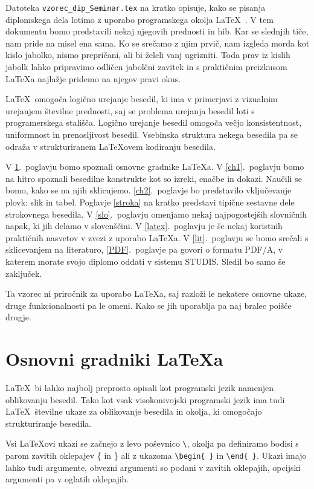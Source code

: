 \documentclass[a4paper, 12pt]{book}
\begin{document}
Datoteka {\tt vzorec\_dip\_Seminar.tex} na kratko opisuje, kako se pisanja diplomskega dela lotimo z uporabo programskega okolja \LaTeX~\cite{lamport,nenajkrajsi}. 
V tem dokumentu bomo predstavili nekaj njegovih prednosti in hib. 
Kar se slednjih tiče, nam pride na misel ena sama. 
Ko se srečamo z njim prvič, nam izgleda morda kot kislo jabolko, nismo prepričani, ali bi želeli vanj ugrizniti. 
Toda prav iz kislih jabolk lahko pripravimo odličen jabolčni zavitek in s praktičnim preizkusom \LaTeX a najlažje pridemo na njegov pravi okus.

\LaTeX\ omogoča logično urejanje besedil, ki ima v primerjavi z vizualnim urejanjem številne prednosti, saj se problema urejanja besedil loti s programerskega stališča.
Logično urejanje besedil omogoča večjo konsistentnost, uniformnost in  prenosljivost besedil. 
Vsebinska struktura nekega besedila pa se odraža v strukturiranem \LaTeX ovem kodiranju besedila.

V \ref{ch0}.~poglavju bomo spoznali osnovne gradnike \LaTeX{a}.
V \ref{ch1}.~poglavju bomo na hitro spoznali besedilne konstrukte kot so izreki, enačbe in dokazi. 
Naučili se bomo, kako se na njih sklicujemo. 
\ref{ch2}.~poglavje bo predstavilo vključevanje plovk: slik in tabel. 
Poglavje \ref{stroka} na kratko predstavi tipične sestavne dele strokovnega besedila.
V \ref{slo}.~poglavju omenjamo nekaj najpogostejših slovničnih napak, ki jih delamo v slovenščini.
V \ref{latex}.~poglavju je še nekaj koristnih praktičnih nasvetov v zvezi z uporabo \LaTeX{a}.
V \ref{lit}.~poglavju se bomo srečali s sklicevanjem na literaturo,
\ref{PDF}.~poglavje pa govori o formatu PDF/A, v katerem morate svojo diplomo oddati v sistemu STUDIS.
Sledil bo samo še zaključek.

Ta vzorec ni priročnik za uporabo \LaTeX{a}, saj razloži le nekatere osnovne ukaze, druge funkcionalnosti pa le omeni. Kako se jih uporablja
pa naj bralec poišče drugje.


\chapter{Osnovni gradniki \LaTeX{a}}
\label{ch0}

\LaTeX\ bi lahko najbolj preprosto opisali kot programski jezik namenjen oblikovanju besedil.
Tako kot vsak visokonivojski programski jezik ima tudi \LaTeX\  številne ukaze za oblikovanje  besedila in okolja, ki omogočajo strukturiranje besedila.

Vsi \LaTeX ovi ukazi se začnejo z levo poševnico  \verb=\=, okolja pa definiramo bodisi s parom zavitih oklepajev \{ in \} ali z ukazoma \verb=\begin{ }= in   \verb=\end{ }=.
Ukazi imajo lahko tudi argumente, obvezni argumenti so podani v zavitih oklepajih, opcijski argumenti pa v oglatih oklepajih.
\end{document}
